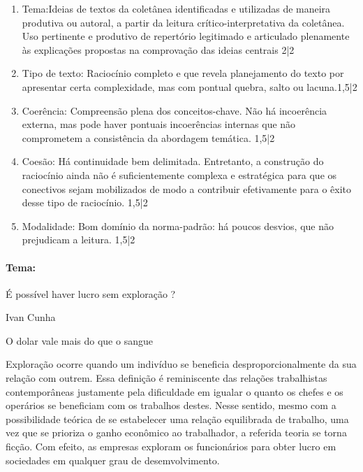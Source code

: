 \documentclass{article}
\begin{document}
\begin{enumerate}
\item Tema:Ideias de textos da coletânea identificadas e utilizadas de maneira produtiva ou autoral, a partir da leitura crítico-interpretativa da coletânea. Uso pertinente e produtivo de repertório legitimado e articulado plenamente às explicações propostas na comprovação das ideias centrais 2|2
\item Tipo de texto: Raciocínio completo e que revela planejamento do texto por apresentar certa complexidade, mas com pontual quebra, salto ou lacuna.1,5|2
\item Coerência: Compreensão plena dos conceitos-chave. Não há incoerência externa, mas pode haver pontuais incoerências internas que não comprometem a consistência da abordagem temática. 1,5|2
\item Coesão: Há continuidade bem delimitada. Entretanto, a construção do raciocínio ainda não é suficientemente complexa e estratégica para que os conectivos sejam mobilizados de modo a contribuir efetivamente para o êxito desse tipo de raciocínio. 1,5|2
\item Modalidade: Bom domínio da norma-padrão: há poucos desvios, que não prejudicam a leitura. 1,5|2
\end{enumerate}

\newpage

\paragraph{Tema:} É possível haver lucro sem exploração ?

\begin{flushright} Ivan Cunha \end{flushright}
O dolar vale mais do que o sangue 

Exploração ocorre quando um indivíduo se beneficia desproporcionalmente da sua relação com outrem. Essa definição é reminiscente das relações trabalhistas contemporâneas justamente pela dificuldade em igualar o quanto os chefes e os operários se beneficiam com os trabalhos destes. Nesse sentido, mesmo com a possibilidade teórica de se estabelecer uma relação equilibrada de trabalho, uma vez que se prioriza o ganho econômico ao trabalhador, a referida teoria se torna ficção. Com efeito, as empresas exploram os funcionários para obter lucro em sociedades em qualquer grau de desemvolvimento.
\end{document}
